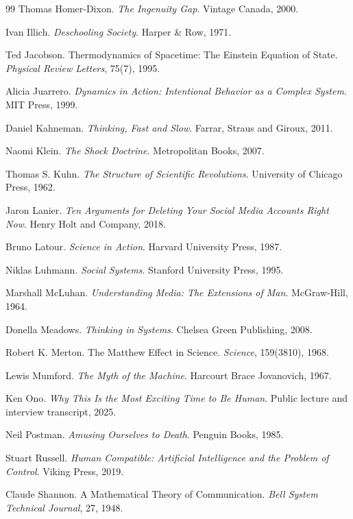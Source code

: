 \documentclass[12pt, a4paper]{article}
\theoremstyle{remark}
\begin{document}
\begin{thebibliography}{99}
Thomas Homer-Dixon.
\textit{The Ingenuity Gap}.
Vintage Canada, 2000.

Ivan Illich.
\textit{Deschooling Society}.
Harper \& Row, 1971.

Ted Jacobson.
Thermodynamics of Spacetime: The Einstein Equation of State.
\textit{Physical Review Letters}, 75(7), 1995.

Alicia Juarrero.
\textit{Dynamics in Action: Intentional Behavior as a Complex System}.
MIT Press, 1999.

Daniel Kahneman.
\textit{Thinking, Fast and Slow}.
Farrar, Straus and Giroux, 2011.

Naomi Klein.
\textit{The Shock Doctrine}.
Metropolitan Books, 2007.

Thomas S. Kuhn.
\textit{The Structure of Scientific Revolutions}.
University of Chicago Press, 1962.

Jaron Lanier.
\textit{Ten Arguments for Deleting Your Social Media Accounts Right Now}.
Henry Holt and Company, 2018.

Bruno Latour.
\textit{Science in Action}.
Harvard University Press, 1987.

Niklas Luhmann.
\textit{Social Systems}.
Stanford University Press, 1995.

Marshall McLuhan.
\textit{Understanding Media: The Extensions of Man}.
McGraw-Hill, 1964.

Donella Meadows.
\textit{Thinking in Systems}.
Chelsea Green Publishing, 2008.

Robert K. Merton.
The Matthew Effect in Science.
\textit{Science}, 159(3810), 1968.

Lewis Mumford.
\textit{The Myth of the Machine}.
Harcourt Brace Jovanovich, 1967.

Ken Ono.
\textit{Why This Is the Most Exciting Time to Be Human}.
Public lecture and interview transcript, 2025.

Neil Postman.
\textit{Amusing Ourselves to Death}.
Penguin Books, 1985.

Stuart Russell.
\textit{Human Compatible: Artificial Intelligence and the Problem of Control}.
Viking Press, 2019.

Claude Shannon.
A Mathematical Theory of Communication.
\textit{Bell System Technical Journal}, 27, 1948.


\end{thebibliography}
\end{document}
